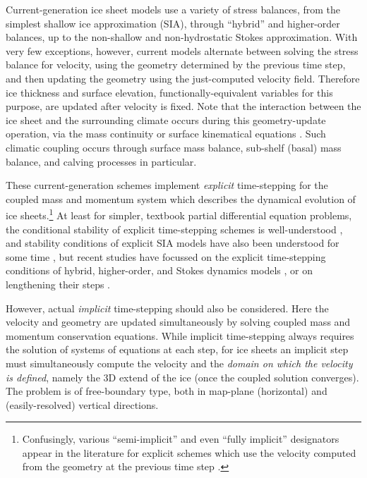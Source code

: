 \documentclass[twocolumn,letterpaper]{igs}
\begin{document}
Current-generation ice sheet models use a variety of stress balances, from the simplest shallow ice approximation (SIA), through ``hybrid'' \citep{Robinsonetal2022,Winkelmannetal2011} and higher-order balances, up to the non-shallow and non-hydrostatic Stokes approximation.  With very few exceptions, however, current models alternate between solving the stress balance for velocity, using the geometry determined by the previous time step, and then updating the geometry using the just-computed velocity field.  Therefore ice thickness and surface elevation, functionally-equivalent variables for this purpose, are updated after velocity is fixed.  Note that the interaction between the ice sheet and the surrounding climate occurs during this geometry-update operation, via the mass continuity or surface kinematical equations \citep{GreveBlatter2009}.  Such climatic coupling occurs through surface mass balance, sub-shelf (basal) mass balance, and calving processes in particular.

These current-generation schemes implement \emph{explicit} time-stepping for the coupled mass and momentum system which describes the dynamical evolution of ice sheets.\footnote{Confusingly, various ``semi-implicit'' and even ``fully implicit'' designators appear in the literature for explicit schemes which use the velocity computed from the geometry at the previous time step \citep[for example]{Chengetal2017}.}  At least for simpler, textbook partial differential equation problems, the conditional stability of explicit time-stepping schemes is well-understood \citep{LeVeque2007}, and stability conditions of explicit SIA models have also been understood for some time \citep{HindmarshPayne1996}, but recent studies have focussed on the explicit time-stepping conditions of hybrid, higher-order, and Stokes dynamics models \citep{Chengetal2017,Robinsonetal2022}, or on lengthening their steps \citep{LofgrenAhlkronaHelanow2021}.

However, actual \emph{implicit} time-stepping \citep{Bueler2021,LeVeque2007} should also be considered.  Here the velocity and geometry are updated simultaneously by solving coupled mass and momentum conservation equations.  While implicit time-stepping always requires the solution of systems of equations at each step, for ice sheets an implicit step must simultaneously compute the velocity and the \emph{domain on which the velocity is defined}, namely the 3D extend of the ice (once the coupled solution converges).  The problem is of free-boundary type, both in map-plane (horizontal) \citep{SchoofHewitt2013} and (easily-resolved) vertical directions.
\end{document}
